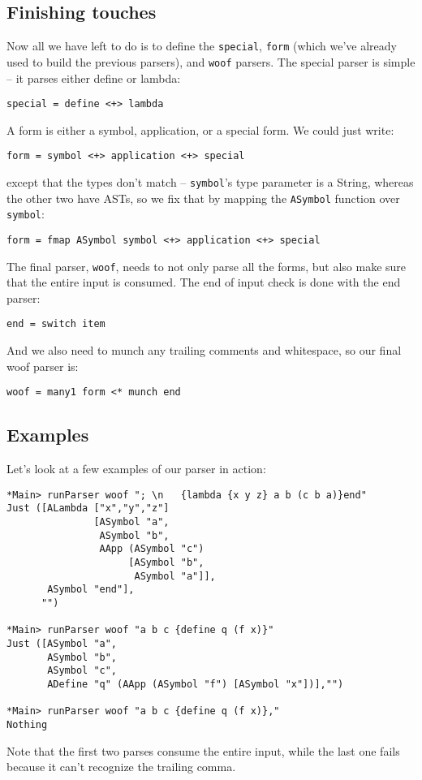 \documentclass{tmr}
\begin{document}
\subsection{Finishing touches}
Now all we have left to do is to define the \verb+special+, \verb+form+ (which 
we've already used to build the previous parsers), and \verb+woof+ parsers.  
The special parser is simple -- it parses either define or lambda:
\begin{verbatim}
special = define <+> lambda
\end{verbatim}

A form is either a symbol, application, or a special form.  We could just write:
\begin{verbatim}
form = symbol <+> application <+> special
\end{verbatim}

except that the types don't match -- \verb+symbol+'s type parameter is a String, 
whereas the other two have ASTs, so we fix that by mapping the \verb+ASymbol+ 
function over \verb+symbol+:
\begin{verbatim}
form = fmap ASymbol symbol <+> application <+> special
\end{verbatim}

The final parser, \verb+woof+, needs to not only parse all the forms, but also 
make sure that the entire input is consumed.  The end of input check is done 
with the end parser:
\begin{verbatim}
end = switch item
\end{verbatim}

And we also need to munch any trailing comments and whitespace, so our final 
woof parser is:
\begin{verbatim}
woof = many1 form <* munch end
\end{verbatim}

\subsection{Examples}
Let's look at a few examples of our parser in action:
\begin{verbatim}
*Main> runParser woof "; \n   {lambda {x y z} a b (c b a)}end"
Just ([ALambda ["x","y","z"] 
               [ASymbol "a",
                ASymbol "b",
                AApp (ASymbol "c") 
                     [ASymbol "b",
                      ASymbol "a"]],
       ASymbol "end"],
      "")

*Main> runParser woof "a b c {define q (f x)}"
Just ([ASymbol "a",
       ASymbol "b",
       ASymbol "c",
       ADefine "q" (AApp (ASymbol "f") [ASymbol "x"])],"")

*Main> runParser woof "a b c {define q (f x)},"
Nothing
\end{verbatim}
Note that the first two parses consume the entire input, while the last one 
fails because it can't recognize the trailing comma.
\end{document}
